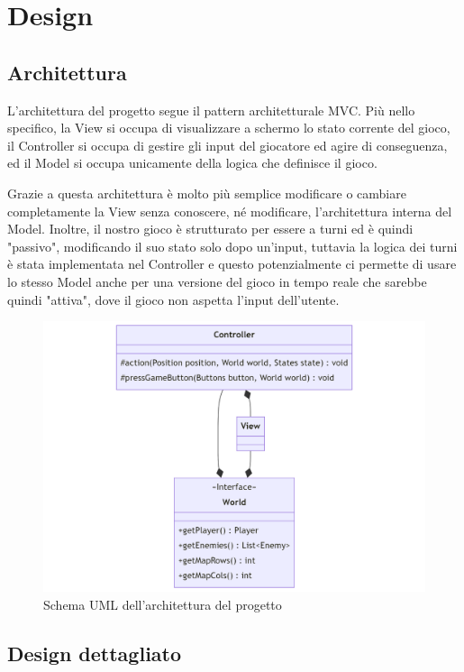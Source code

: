 \documentclass[a4paper,12pt]{report}
\begin{document}
\chapter{Design}

\section{Architettura}

L'architettura del progetto segue il pattern architetturale MVC.
%
Più nello specifico, la View si occupa di visualizzare a schermo lo stato corrente del gioco,
il Controller si occupa di gestire gli input del giocatore ed agire di conseguenza, ed
il Model si occupa unicamente della logica che definisce il gioco.

Grazie a questa architettura è molto più semplice modificare o cambiare completamente la View
senza conoscere, né modificare, l'architettura interna del Model.
%
Inoltre, il nostro gioco è strutturato per essere a turni ed è quindi "passivo", modificando il suo stato solo dopo un'input,
tuttavia la logica dei turni è stata implementata nel Controller e questo potenzialmente ci permette di usare lo stesso Model
anche per una versione del gioco in tempo reale che sarebbe quindi "attiva", dove il gioco non aspetta l'input dell'utente.

\begin{figure}[H]
	\centering{}
	\includegraphics[width=\textwidth]{img/Architecture.png}
	\caption{Schema UML dell'architettura del progetto}
	\label{img:Architecture}
\end{figure}

\section{Design dettagliato}
\end{document}
